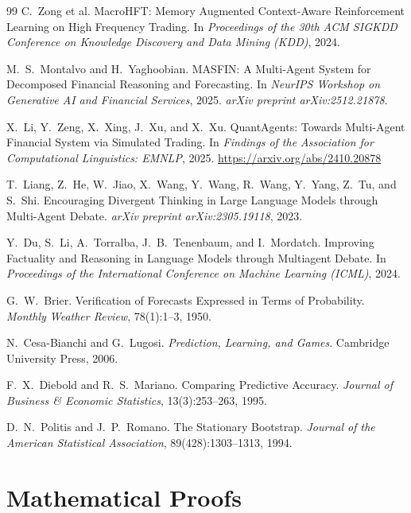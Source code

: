 \documentclass[10pt,a4paper,twocolumn]{article}
\begin{document}
\begin{thebibliography}{99}
C.~Zong et al.
\newblock MacroHFT: Memory Augmented Context-Aware Reinforcement Learning on High Frequency Trading.
\newblock In \emph{Proceedings of the 30th ACM SIGKDD Conference on Knowledge Discovery and Data Mining (KDD)}, 2024.

M.~S.~Montalvo and H.~Yaghoobian.
\newblock MASFIN: A Multi-Agent System for Decomposed Financial Reasoning and Forecasting.
\newblock In \emph{NeurIPS Workshop on Generative AI and Financial Services}, 2025. \emph{arXiv preprint arXiv:2512.21878}.

X.~Li, Y.~Zeng, X.~Xing, J.~Xu, and X.~Xu.
\newblock QuantAgents: Towards Multi-Agent Financial System via Simulated Trading.
\newblock In \emph{Findings of the Association for Computational Linguistics: EMNLP}, 2025. \url{https://arxiv.org/abs/2410.20878}

T.~Liang, Z.~He, W.~Jiao, X.~Wang, Y.~Wang, R.~Wang, Y.~Yang, Z.~Tu, and S.~Shi.
\newblock Encouraging Divergent Thinking in Large Language Models through Multi-Agent Debate.
\newblock \emph{arXiv preprint arXiv:2305.19118}, 2023.

Y.~Du, S.~Li, A.~Torralba, J.~B.~Tenenbaum, and I.~Mordatch.
\newblock Improving Factuality and Reasoning in Language Models through Multiagent Debate.
\newblock In \emph{Proceedings of the International Conference on Machine Learning (ICML)}, 2024.

G.~W.~Brier.
\newblock Verification of Forecasts Expressed in Terms of Probability.
\newblock \emph{Monthly Weather Review}, 78(1):1--3, 1950.

N.~Cesa-Bianchi and G.~Lugosi.
\newblock \emph{Prediction, Learning, and Games}.
\newblock Cambridge University Press, 2006.

F.~X.~Diebold and R.~S.~Mariano.
\newblock Comparing Predictive Accuracy.
\newblock \emph{Journal of Business \& Economic Statistics}, 13(3):253--263, 1995.

D.~N.~Politis and J.~P.~Romano.
\newblock The Stationary Bootstrap.
\newblock \emph{Journal of the American Statistical Association}, 89(428):1303--1313, 1994.

\end{thebibliography}

\appendix
\balance
\section{Mathematical Proofs}
\label{app:proofs}
\end{document}
